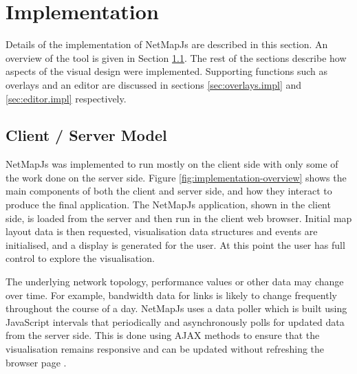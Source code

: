 \documentclass[11pt, a4paper]{article}
\begin{document}
\newpage

\section{Implementation} 
\label{sec:implementation}

Details of the implementation of NetMapJs are described in this section. An
overview of the tool is given in Section \ref{sec:client-server-model.impl}. The
rest of the sections describe how aspects of the visual design were implemented.
Supporting functions such as overlays and an editor are discussed in sections
\ref{sec:overlays.impl} and \ref{sec:editor.impl} respectively.

\subsection{Client / Server Model}
\label{sec:client-server-model.impl}

NetMapJs was implemented to run mostly on the client side with only some of the
work done on the server side. Figure \ref{fig:implementation-overview} shows the
main components of both the client and server side, and how they interact to
produce the final application. The NetMapJs application, shown in the client
side, is loaded from the server and then run in the client web browser. Initial
map layout data is then requested, visualisation data structures and events are
initialised, and a display is generated for the user. At this point the user has
full control to explore the visualisation.

The underlying network topology, performance values or other data may change
over time. For example, bandwidth data for links is likely to change frequently
throughout the course of a day. NetMapJs uses a data poller which is built using
JavaScript intervals that periodically and asynchronously polls for updated data
from the server side. This is done using AJAX methods to ensure that the
visualisation remains responsive and can be updated without refreshing the
browser page \cite{Paulson_2005}.
\end{document}
